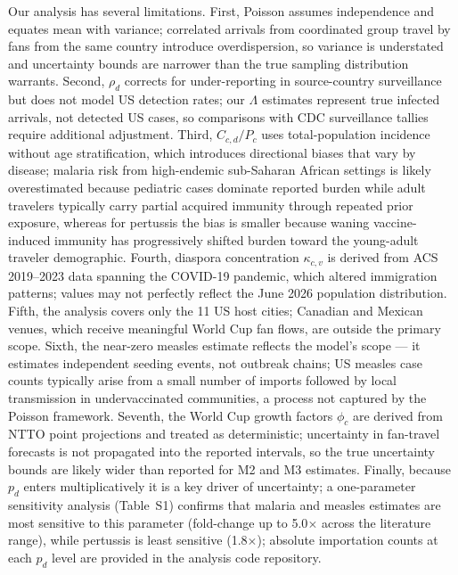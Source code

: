 \documentclass[12pt, a4paper]{article}
\begin{document}
Our analysis has several limitations. First, Poisson assumes independence and equates mean with variance; correlated arrivals from coordinated group travel by fans from the same country introduce overdispersion, so variance is understated and uncertainty bounds are narrower than the true sampling distribution warrants. Second, $\rho_d$ corrects for under-reporting in source-country surveillance but does not model US detection rates; our $\Lambda$ estimates represent true infected arrivals, not detected US cases, so comparisons with CDC surveillance tallies require additional adjustment. Third, $C_{c,d}/P_c$ uses total-population incidence without age stratification, which introduces directional biases that vary by disease; malaria risk from high-endemic sub-Saharan African settings is likely overestimated because pediatric cases dominate reported burden while adult travelers typically carry partial acquired immunity through repeated prior exposure, whereas for pertussis the bias is smaller because waning vaccine-induced immunity has progressively shifted burden toward the young-adult traveler demographic. Fourth, diaspora concentration $\kappa_{c,v}$ is derived from ACS 2019--2023 data spanning the COVID-19 pandemic, which altered immigration patterns; values may not perfectly reflect the June 2026 population distribution. Fifth, the analysis covers only the 11 US host cities; Canadian and Mexican venues, which receive meaningful World Cup fan flows, are outside the primary scope. Sixth, the near-zero measles estimate reflects the model's scope --- it estimates independent seeding events, not outbreak chains; US measles case counts typically arise from a small number of imports followed by local transmission in undervaccinated communities, a process not captured by the Poisson framework. Seventh, the World Cup growth factors $\phi_c$ are derived from NTTO point projections and treated as deterministic; uncertainty in fan-travel forecasts is not propagated into the reported intervals, so the true uncertainty bounds are likely wider than reported for M2 and M3 estimates. Finally, because $p_d$ enters multiplicatively it is a key driver of uncertainty; a one-parameter sensitivity analysis (Table~S1) confirms that malaria and measles estimates are most sensitive to this parameter (fold-change up to 5.0$\times$ across the literature range), while pertussis is least sensitive (1.8$\times$); absolute importation counts at each $p_d$ level are provided in the analysis code repository.

\end{document}
